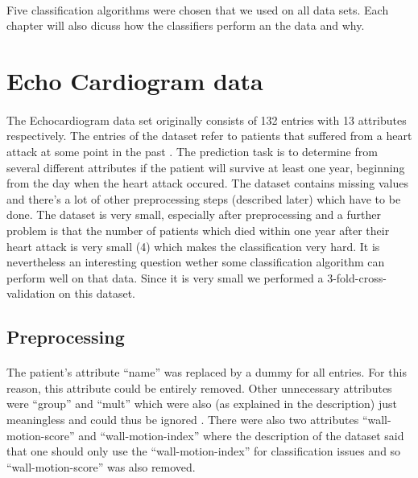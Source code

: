 \documentclass[paper=a4, fontsize=11pt]{scrartcl} %
\numberwithin{equation}{section} %
\numberwithin{figure}{section} %
\numberwithin{table}{section} %
\begin{document}
\paragraph{}Five classification algorithms were chosen that we used on all data sets. Each chapter will also dicuss how the classifiers perform an the data and why.




\section{Echo Cardiogram data}

\paragraph{}The Echocardiogram data set originally consists of 132 entries with 13 attributes respectively. The entries of the dataset refer to patients that suffered from a heart attack at some point in the past \cite{uci-repo}. The prediction task is to determine from several different attributes if the patient will survive at least one year, beginning from the day when the heart attack occured. The dataset contains missing values and there's a lot of other preprocessing steps (described later) which have to be done. The dataset is very small, especially after preprocessing and a further problem is that the number of patients which died within one year after their heart attack is very small (4) which makes the classification very hard. It is nevertheless an interesting question wether some classification algorithm can perform well on that data. Since it is very small we performed a 3-fold-cross-validation on this dataset.


\subsection{Preprocessing}

\paragraph{}The patient's attribute ``name'' was replaced by a dummy for all entries. For this reason, this attribute could be entirely removed. Other unnecessary attributes were ``group'' and ``mult'' which were also (as explained in the description) just meaningless and could thus be ignored \cite{uci-repo}. There were also two attributes ``wall-motion-score'' and ``wall-motion-index'' where the description of the dataset said that one should only use the ``wall-motion-index'' for classification issues and so ``wall-motion-score'' was also removed.
\end{document}
